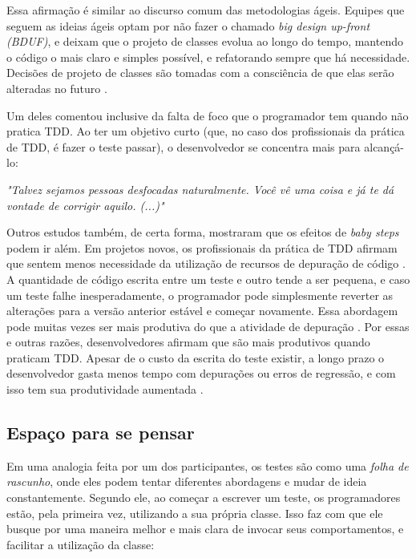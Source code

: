 Essa afirmação é similar ao discurso comum das metodologias ágeis.
Equipes que seguem as ideias ágeis optam por não fazer o chamado \textit{big design up-front (BDUF)},
e deixam que o projeto de classes evolua ao longo do tempo, mantendo o código o mais claro e
simples possível, e refatorando sempre que há necessidade. Decisões de
projeto de classes são tomadas com a consciência de que elas serão alteradas no futuro
\cite{is-design-dead}.

Um deles comentou inclusive da falta de foco que o programador tem quando não pratica TDD.
Ao ter um objetivo curto (que, no caso dos profissionais da prática de TDD, é fazer o teste passar), o
desenvolvedor se concentra mais para alcançá-lo:

\begin{framed}
\textit{"Talvez sejamos pessoas desfocadas naturalmente. Você vê uma coisa e já te dá vontade
de corrigir aquilo. (...)"}
\end{framed}

Outros estudos também, de certa forma, mostraram que os efeitos de \textit{baby steps}
podem ir além.
Em projetos novos, os profissionais da prática de TDD afirmam que sentem menos necessidade da
utilização de recursos de depuração de código \cite{george-williams-experiment} 
\cite{janzen-arch-improvement}. 
A quantidade de código
escrita entre um teste e outro tende a ser pequena, e caso um teste falhe
inesperadamente, o programador pode simplesmente reverter as alterações para a 
versão anterior estável e começar novamente. Essa abordagem pode muitas vezes
ser mais produtiva do que a atividade de depuração 
\cite{janzen-arch-improvement}. Por essas e outras razões, desenvolvedores afirmam 
que são mais produtivos quando praticam TDD. Apesar de o custo da escrita do teste
existir, a longo prazo o desenvolvedor gasta menos tempo com depurações ou 
erros de regressão, e com isso tem sua produtividade aumentada
\cite{george-e-williams}.

\subsection{Espaço para se pensar}

Em uma analogia feita por um dos participantes, os testes são como uma 
\textit{folha de rascunho}, 
onde eles podem tentar diferentes abordagens e mudar de ideia constantemente. Segundo ele,
ao começar a escrever um teste, os programadores estão, pela primeira vez, utilizando a sua 
própria classe. Isso faz com que ele busque por uma maneira melhor e mais clara de invocar
seus comportamentos, e facilitar a utilização da classe:

